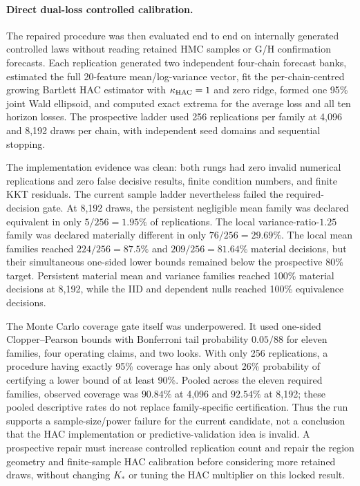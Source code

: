 \paragraph{Direct dual-loss controlled calibration.}
The repaired procedure was then evaluated end to end on internally generated
controlled laws without reading retained HMC samples or G/H confirmation
forecasts.  Each replication generated two independent four-chain forecast
banks, estimated the full 20-feature mean/log-variance vector, fit the
per-chain-centred growing Bartlett HAC estimator with
$\kappa_{\rm HAC}=1$ and zero ridge, formed one 95\% joint Wald ellipsoid, and
computed exact extrema for the average loss and all ten horizon losses.  The
prospective ladder used 256 replications per family at 4,096 and 8,192 draws
per chain, with independent seed domains and sequential stopping.

The implementation evidence was clean: both rungs had zero invalid numerical
replications and zero false decisive results, finite condition numbers, and
finite KKT residuals.  The current sample ladder nevertheless failed the
required-decision gate.  At 8,192 draws, the persistent negligible mean family
was declared equivalent in only $5/256=1.95\%$ of replications.  The local
variance-ratio-$1.25$ family was declared materially different in only
$76/256=29.69\%$.  The local mean families reached $224/256=87.5\%$ and
$209/256=81.64\%$ material decisions, but their simultaneous one-sided lower
bounds remained below the prospective 80\% target.  Persistent material mean
and variance families reached 100\% material decisions at 8,192, while the
IID and dependent nulls reached 100\% equivalence decisions.

The Monte Carlo coverage gate itself was underpowered.  It used one-sided
Clopper--Pearson bounds with Bonferroni tail probability $0.05/88$ for eleven
families, four operating claims, and two looks.  With only 256 replications, a
procedure having exactly 95\% coverage has only about 26\% probability of
certifying a lower bound of at least 90\%.  Pooled across the eleven required
families, observed coverage was $90.84\%$ at 4,096 and $92.54\%$ at 8,192;
these pooled descriptive rates do not replace family-specific certification.
Thus the run supports a sample-size/power failure for the current candidate,
not a conclusion that the HAC implementation or predictive-validation idea is
invalid.  A prospective repair must increase controlled replication count and
repair the region geometry and finite-sample HAC calibration before considering
more retained draws, without changing $K_*$ or tuning the HAC multiplier on
this locked result.

